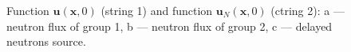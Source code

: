 \documentclass[a4paper]{jpconf}
\begin{document}
\begin{figure}[!h]
\begin{center}
\begin{minipage}{0.3\linewidth}
 \\
\end{minipage}

\begin{minipage}{0.051\linewidth}
\center{~} \\
\end{minipage}
\hfill
\begin{minipage}{0.3\linewidth}
 \\
\end{minipage}
\hfill
\begin{minipage}{0.3\linewidth}
 \\
\end{minipage}
\hfill
\begin{minipage}{0.3\linewidth}
 \\
\end{minipage}
\hfill

\caption{Function $\bm u(\bm x, 0)$ (string 1) and function  $\bm u_N(\bm x, 0)$ (ctring 2):
a --- neutron flux of group 1, b --- neutron flux of group 2, c --- delayed neutrons source.}
\label{fig:4}
  \end{center}
\end{figure}
\end{document}

